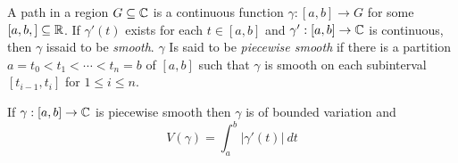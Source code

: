\begin{definition}
    A path in a region $G\subseteq\mathbb{C}$ is a continuous function $\gamma: [a,b]\to G$ for some $[a,b,]\subseteq\mathbb{R}$. If $\gamma'(t)$ exists for each $t\in[a,b]$ and $\gamma':[a,b]\to\mathbb{C}$ is continuous, then $\gamma$ issaid to be \textit{smooth}. $\gamma$ Is said to be \textit{piecewise smooth} if there is a partition $a = t_0 < t_1 < \cdots < t_n = b$ of $[a,b]$ such that $\gamma$ is smooth on each subinterval $[t_{i - 1}, t_i]$ for $1\le i\le n$. 
\end{definition}

\begin{proposition}
    If $\gamma: [a,b]\to\mathbb{C}$ is piecewise smooth then $\gamma$ is of bounded variation and 
    \begin{equation*}
        V(\gamma) = \int_a^b|\gamma'(t)|~dt
    \end{equation*}
\end{proposition}

